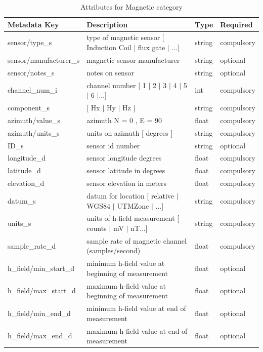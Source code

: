 \documentclass{article}
\begin{document}
\begin{table}[htb!]
	\caption[Attributes for Magnetic Channel]{Attributes for Magnetic category}
	\begin{tabular}{|l|p{3in}|l|l|}
		\hline
		\textbf{Metadata Key} & \textbf{Description} & \textbf{Type} & \textbf{Required} \\ \hline
		sensor/type\_s & type of magnetic sensor [ Induction Coil $|$ flux gate $|$ ...] & string & compulsory\\ \hline
		sensor/manufacturer\_s & magnetic sensor manufacturer & string & optional \\ \hline
		sensor/notes\_s & notes on sensor & string &  optional\\ \hline
		channel\_num\_i & channel number [ 1 $|$ 2 $|$ 3 $|$ 4 $|$ 5 $|$ 6 $|$...] & int & compulsory \\ \hline
		component\_s & [ Hx $|$ Hy $|$ Hz ] & string  &  compulsory \\ \hline
		azimuth/value\_s & azimuth N = 0 ,  E = 90 & float &  compulsory\\ \hline
		azimuth/units\_s & units on azimuth [ degrees ] & string &  compulsory\\ \hline
		ID\_s & sensor id number & string &  optional \\ \hline
		longitude\_d & sensor longitude degrees & float & compulsory \\ \hline
		latitude\_d & sensor latitude in degrees & float & compulsory \\ \hline
		elevation\_d & sensor elevation in meters & float &  compulsory\\ \hline
		datum\_s & datum for location [ relative $|$ WGS84 $|$ UTMZone $|$ ...] & string &  compulsory\\ \hline
		units\_s & units of h-field measurement [ counts $|$ mV $|$ nT...] & string &  compulsory \\ \hline
		sample\_rate\_d & sample rate of magnetic channel (samples/second) & float &  compulsory \\ \hline
		h\_field/min\_start\_d & minimum h-field value at beginning of measurement & float & optional \\ \hline
		h\_field/max\_start\_d & maximum h-field value at beginning of measurement & float &  optional \\ \hline
		h\_field/min\_end\_d & minimum h-field value at end of measurement & float &  optional \\ \hline
		h\_field/max\_end\_d & maximum h-field value at end of measurement & float &  optional \\ \hline

\end{tabular}
\end{table}
\end{document}
